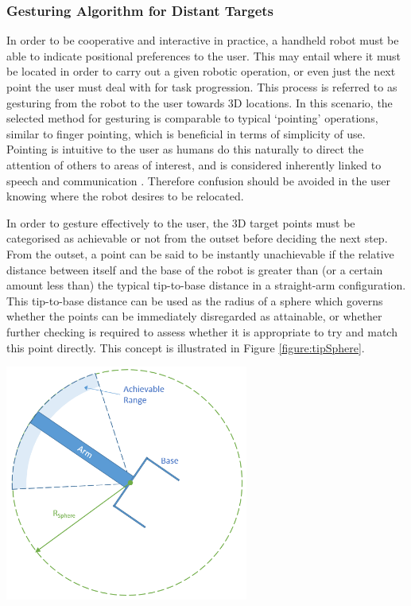 \documentclass[11pt]{article}
\begin{document}
\subsubsection{Gesturing Algorithm for Distant Targets}
In order to be cooperative and interactive in practice, a handheld robot must be able to indicate positional preferences to the user. This may entail where it must be located in order to carry out a given robotic operation, or even just the next point the user must deal with for task progression. This process is referred to as gesturing from the robot to the user towards 3D locations. In this scenario, the selected method for gesturing is comparable to typical `pointing' operations, similar to finger pointing, which is beneficial in terms of simplicity of use. Pointing is intuitive to the user as humans do this naturally to direct the attention of others to areas of interest, and is considered inherently linked to speech and communication \cite{butterworth2003}. Therefore confusion should be avoided in the user knowing where the robot desires to be relocated.

In order to gesture effectively to the user, the 3D target points must be categorised as achievable or not from the outset before deciding the next step. From the outset, a point can be said to be instantly unachievable if the relative distance between itself and the base of the robot is greater than (or a certain amount less than) the typical tip-to-base distance in a straight-arm configuration. This tip-to-base distance can be used as the radius of a sphere which governs whether the points can be immediately disregarded as attainable, or whether further checking is required to assess whether it is appropriate to try and match this point directly. This concept is illustrated in Figure \ref{figure:tipSphere}.

\begin{center}
\includegraphics[width=0.6\textwidth]{images/tipSphere.png}
\label{figure:tipSphere}
\end{center}
\end{document}
